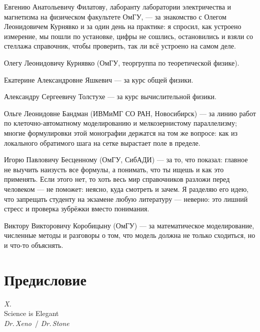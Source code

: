 \noindent
Евгению Анатольевичу Филатову, лаборанту лаборатории электричества и магнетизма
на физическом факультете ОмГУ, --- за знакомство с Олегом Леонидовичем Курнявко
и за один день на практике: я спросил, как устроено измерение, мы пошли по установке,
цифры не сошлись, остановились и взяли со стеллажа справочник, чтобы проверить,
так ли всё устроено на самом деле.

\medskip
\noindent
Олегу Леонидовичу Курнявко (ОмГУ, теоргруппа по теоретической физике).

\medskip
\noindent
Екатерине Александровне Яшкевич --- за курс общей физики.

\medskip
\noindent
Александру Сергеевичу Толстухе --- за курс вычислительной физики.

\medskip
\noindent
Ольге Леонидовне Бандман (ИВМиМГ СО РАН, Новосибирск) --- за линию работ
по клеточно-автоматному моделированию и мелкозернистому параллелизму;
многие формулировки этой монографии держатся на том же вопросе:
как из локального обратимого шага на сетке вырастает поле в пределе.

\medskip
\noindent
Игорю Павловичу Бесценному (ОмГУ, СибАДИ) --- за то, что показал: главное не выучить
наизусть все формулы, а понимать, что ты ищешь и как это применять.
Если этого нет, то хоть весь мир справочников разложи перед человеком --- не поможет:
неясно, куда смотреть и зачем.
Я разделяю его идею, что запрещать студенту на экзамене любую литературу --- неверно:
это лишний стресс и проверка зубрёжки вместо понимания.

\medskip
\noindent
Виктору Викторовичу Коробицыну (ОмГУ) --- за математическое моделирование,
численные методы и разговоры о том, что модель должна не только сходиться, но и что-то объяснять.

\chapter*{Предисловие}

\begin{flushright}
\begin{minipage}{0.55\textwidth}
\raggedleft
\textit{X.}\\[0.8em]
{\large Science is Elegant}\\[0.6em]
\emph{Dr.\,Xeno}\ / \emph{Dr.\,Stone}
\end{minipage}
\end{flushright}
\vspace{1.5em}

